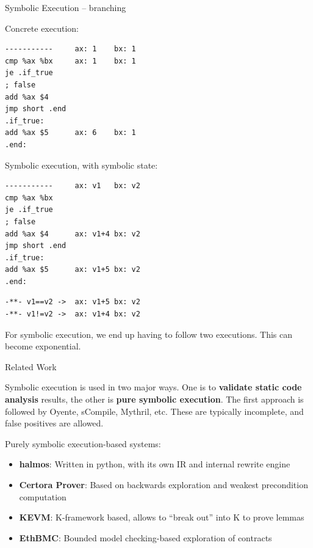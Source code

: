 \documentclass[aspectratio=169]{beamer}
\begin{document}
\begin{frame}[fragile=singleslide]{Symbolic Execution -- branching}
\begin{minipage}[t]{0.45\textwidth}
Concrete execution:
\begin{Verbatim}[fontsize=\small]
-----------     ax: 1    bx: 1
cmp %ax %bx     ax: 1    bx: 1
je .if_true     
; false
add %ax $4
jmp short .end
.if_true:
add %ax $5      ax: 6    bx: 1
.end:
\end{Verbatim}
\end{minipage}%
\begin{minipage}[t]{0.45\textwidth}
Symbolic execution, with symbolic state:
\begin{Verbatim}[fontsize=\small]
-----------     ax: v1   bx: v2
cmp %ax %bx     
je .if_true     
; false
add %ax $4      ax: v1+4 bx: v2
jmp short .end
.if_true:
add %ax $5      ax: v1+5 bx: v2
.end:
\end{Verbatim}
\begin{Verbatim}[fontsize=\small]
-**- v1==v2 ->  ax: v1+5 bx: v2
-**- v1!=v2 ->  ax: v1+4 bx: v2
\end{Verbatim}
\end{minipage}
\bigskip

For symbolic execution, we end up having to follow two executions. This can become exponential.
\end{frame}


\begin{frame}{Related Work}

Symbolic execution is used in two major ways. One is to \textbf{validate static code analysis} results, the other is \textbf{pure symbolic execution}. The first approach is followed by Oyente, sCompile, Mythril, etc. These are typically incomplete, and false positives are allowed.

\bigskip

Purely symbolic execution-based systems:
\begin{itemize}
\item \textbf{halmos}: Written in python, with its own IR and internal rewrite engine
\item \textbf{Certora Prover}: Based on backwards exploration and weakest precondition computation
\item \textbf{KEVM}: K-framework based, allows to ``break out'' into K to prove lemmas
\item \textbf{EthBMC}: Bounded model checking-based exploration of contracts
\end{itemize}
\end{frame}
\end{document}
